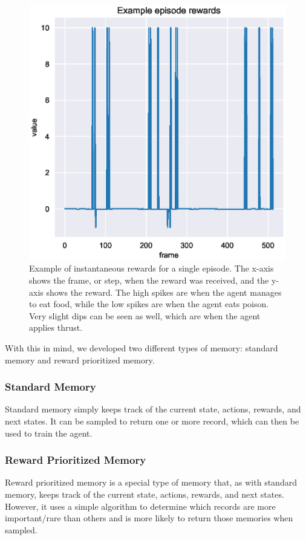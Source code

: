 \begin{figure}[htbp]
    \centering
    \includegraphics[scale=0.75]
    {./figures/example-episode-rewards}
    \caption{
        Example of instantaneous rewards for a single episode.
        The x-axis shows the frame, or step, when the reward was received, and the
        y-axis shows the reward.
        The high spikes are when the agent manages to eat food, while the low spikes
        are when the agent eats poison.
        Very slight dips can be seen as well, which are when the agent applies thrust.
    }
    \label{fig:example-episode-rewards}
\end{figure}

With this in mind, we developed two different types of memory: standard memory and
reward prioritized memory.

\subsubsection{Standard Memory}
Standard memory simply keeps track of the current state, actions, rewards, and next
states.
It can be sampled to return one or more record, which can then be used to train the
agent.

\subsubsection{Reward Prioritized Memory}
Reward prioritized memory is a special type of memory that, as with standard memory,
keeps track of the current state, actions, rewards, and next states.
However, it uses a simple algorithm to determine which records are more important/rare
than others and is more likely to return those memories when sampled.


